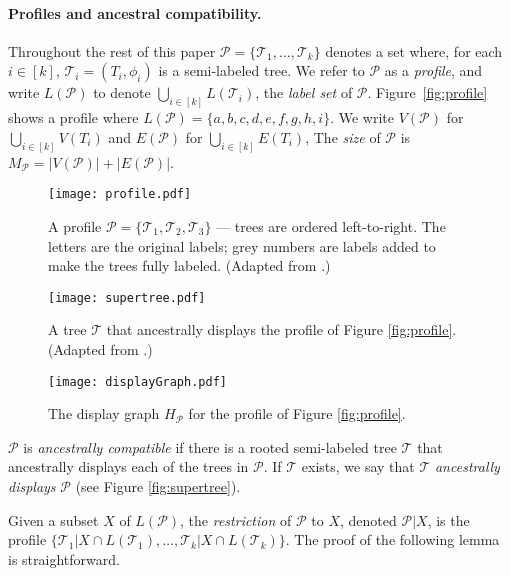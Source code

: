 \documentclass[11pt]{article}
\newcommand{\MP}{\ensuremath{M_\P}} \newcommand{\TG}{\ensuremath{\Gamma}} \newcommand{\incompatible}{\texttt{incompatible}}
\newcommand{\DG}{\ensuremath{H_\P}} \newcommand{\GBNT}{\ensuremath{G_{\mathtt{BNT}}}}
\renewcommand{\P}{\ensuremath{\mathcal{P}}}
\newcommand{\T}{\ensuremath{\mathcal{T}}}
\theoremstyle{definition}
\begin{document}
\vspace{-1.5\parsep}

\paragraph{Profiles and ancestral compatibility.}
Throughout the rest of this paper $\P = \{\T_1, \dots, \T_k\}$ denotes a set where, for each $i \in [k]$, $\T_i = (T_i, \phi_i)$ is a semi-labeled tree. We refer to $\P$ as a \emph{profile}, and write $L(\P)$ to denote $\bigcup_{i\in[k]} L(\T_i)$, the \emph{label set} of $\P$.   Figure~\ref{fig:profile} shows a profile where $L(\P) = \{a,b,c,d,e,f,g,h,i\}$.
We write $V(\P)$ for $\bigcup_{i\in[k]} V(T_i)$ and $E(\P)$ for $\bigcup_{i\in[k]} E(T_i)$, The \emph{size} of $\P$ is $\MP = |V(\P)| + |E(\P)|$.  



\begin{figure}\centering
\begin{minipage}[b]{0.46\linewidth}
  \texttt{[image: profile.pdf]}
  \caption{A profile $\P= \{\T_1, \T_2, \T_3\}$ --- trees are ordered left-to-right. 
The letters are the original labels; grey numbers are labels added to make the trees fully labeled. (Adapted from  \cite{BerrySemple2006}.)}
  \label{fig:profile}
\end{minipage}
\quad
\begin{minipage}[b]{0.24\linewidth}
  \texttt{[image: supertree.pdf]}
  \caption{A tree $\T$ that ancestrally displays the profile of Figure \ref{fig:profile}. (Adapted from  \cite{BerrySemple2006}.)}
  \label{fig:supertree}
\end{minipage}
\quad
\begin{minipage}[b]{0.23\linewidth}
  \texttt{[image: displayGraph.pdf]}
  \caption{The display graph $\DG$ for the profile of Figure \ref{fig:profile}.} \label{fig:displayGraph}
\end{minipage}
\end{figure}

$\P$ is \emph{ancestrally compatible} if there is a rooted semi-labeled  tree $\T$ that ancestrally displays each of the trees in $\P$.  If $\T$ exists, we say that $\T$ \emph{ancestrally displays} $\P$ (see Figure \ref{fig:supertree}). 

Given a subset $X$ of $L(\P)$, the \emph{restriction} of $\P$ to $X$, denoted $\P|X$, is the profile $\{\T_1|X \cap L(\T_1), \dots, \T_k|X \cap L(\T_k)\}$.  The proof of the following lemma is straightforward.
\end{document}
